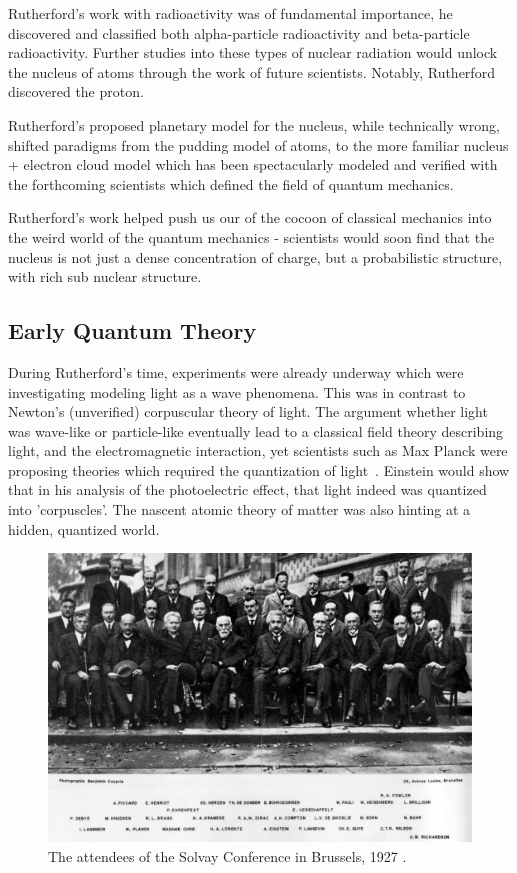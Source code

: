 Rutherford's work with radioactivity was of fundamental importance, he
discovered and classified both alpha-particle radioactivity and beta-particle
radioactivity. Further studies into these types of nuclear radiation would
unlock the nucleus of atoms through the work of future scientists. Notably,
Rutherford discovered the proton.

Rutherford's proposed planetary model for the nucleus, while technically wrong,
shifted paradigms from the pudding model of  atoms, to the more familiar nucleus
+ electron cloud model which has been spectacularly modeled and verified with
the forthcoming scientists which defined the field of quantum mechanics.

Rutherford's work helped push us our of the cocoon of classical mechanics into
the weird world of the quantum mechanics - scientists would soon find that the
nucleus is not just a dense concentration of charge, but a probabilistic
structure, with rich sub nuclear structure.

\clearpage
\subsection{Early Quantum Theory}

During Rutherford's time, experiments were already underway which were
investigating modeling light as a wave phenomena. This was in contrast to
Newton's (unverified) corpuscular theory of light. The argument whether light
was wave-like or particle-like eventually lead to a classical field theory
describing light, and the electromagnetic interaction, yet scientists such as
Max Planck were proposing theories which required the quantization of
light~\cite{Planck1901}. Einstein would show that in his analysis of the
photoelectric effect, that light indeed was quantized into 'corpuscles'. The
nascent atomic theory of matter was also hinting at a hidden, quantized world.

\begin{figure}
	\centering
	\includegraphics[width=\linewidth]{./figures/solvay.jpg}
	\caption{
		The attendees of the Solvay Conference in Brussels, 1927
		 \cite{BenjaminCroupie1927}.
	}
	\label{fig:solvay}
\end{figure}

